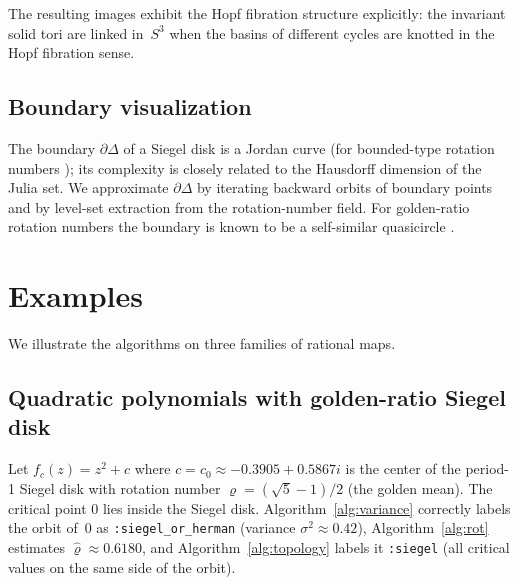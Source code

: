 \documentclass[12pt,a4paper]{article}
\newcommand{\Sthree}{S^3}
\newcommand{\rot}{\varrho}    %
\begin{document}
The resulting images exhibit the Hopf fibration structure explicitly:
the invariant solid tori are linked in~$\Sthree$ when the basins of
different cycles are knotted in the Hopf fibration sense.

\subsection{Boundary visualization}
\label{ssec:boundary}

The boundary $\partial\Delta$ of a Siegel disk is a Jordan curve
(for bounded-type rotation numbers \cite{McMullen1998}); its complexity
is closely related to the Hausdorff dimension of the Julia set.
We approximate $\partial\Delta$ by iterating backward orbits of boundary
points and by level-set extraction from the rotation-number field.
For golden-ratio rotation numbers the boundary is known to be a
self-similar quasicircle \cite{McMullen1998,BuffCheritat2012}.

\section{Examples}
\label{sec:examples}

We illustrate the algorithms on three families of rational maps.

\subsection{Quadratic polynomials with golden-ratio Siegel disk}
\label{ssec:ex_siegel}

Let $f_c(z) = z^2 + c$ where $c = c_0\approx -0.3905 + 0.5867i$ is the
center of the period-1 Siegel disk with rotation number
$\rot = (\sqrt{5}-1)/2$ (the golden mean).
The critical point $0$ lies inside the Siegel disk.
Algorithm~\ref{alg:variance} correctly labels the orbit of~$0$ as
\texttt{:siegel\_or\_herman} (variance $\sigma^2\approx 0.42$),
Algorithm~\ref{alg:rot} estimates $\hat\rot\approx 0.6180$,
and Algorithm~\ref{alg:topology} labels it \texttt{:siegel}
(all critical values on the same side of the orbit).
\end{document}

